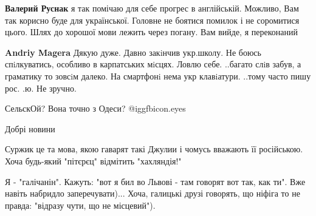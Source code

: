 \begin{itemize}
 

\textbf{Валерий Руснак} я так помічаю для себе прогрес в англійській. Можливо, Вам так корисно буде для української. Головне не боятися помилок і не соромитися цього. Шлях до хорошої мови лежить через погану. Вам вийде, я переконаний

 
\textbf{Andriy Magera} Дякую дуже.
Давно закiнчив укр.школу. Не боюсь спiлкуватись, особливо в карпатських мiсцях. Ловлю себе. ..багато слiв забув, а граматику то зовсiм далеко.
На смартфонi нема укр клавiатури. ..тому часто пишу рос. .ю. Не зручно.

\end{itemize} %

 
СельскОй? Вона точно з Одеси?  @igg{fbicon.eyes} 

 
Добрі новини

 
Суржик це та мова, якою гаварят такі Джулии і чомусь вважають її російською.
Хоча будь-який "пітєрєц" відмітить "хахляндія!"


 

Я - "галічанін". Кажуть: "вот я бил во Львові - там говорят вот так, как ти".
Вже навіть набридло заперечувати)... Хоча, галицькі друзі говорять, що ніфіга
то не правда: "відразу чути, що не місцевий").

